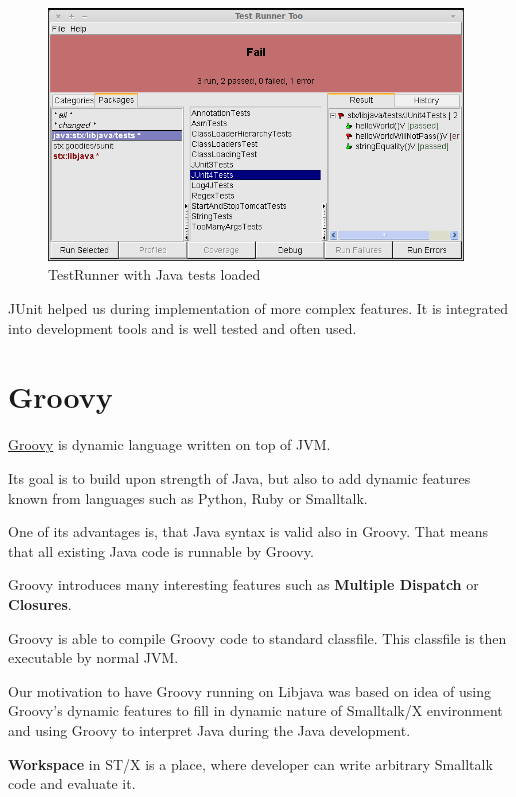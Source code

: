 \documentclass[11pt,twoside,a4paper]{book}
\newcommand{\libjava}{{Libjava}}
\begin{document}
\begin{figure}[ht]
	\begin{center}
		\includegraphics[width=11cm]{figures/test_runner.png}
	\end{center}
	\caption{TestRunner with Java tests loaded}
	\label{fig:test_runner}
\end{figure}

JUnit helped us during implementation of more complex features.
It is integrated into development tools and is well tested and often used.

\section{Groovy}

\href{http://groovy.codehaus.org/}{Groovy} is dynamic language written on top of JVM. 

Its goal is to build upon strength of Java, but also to add dynamic features known from languages such as Python, Ruby or Smalltalk. 

One of its advantages is, that Java syntax is valid also in Groovy. 
That means that all existing Java code is runnable by Groovy.

Groovy introduces many interesting features such as \textbf{Multiple Dispatch} or \textbf{Closures}. 

Groovy is able to compile Groovy code to standard classfile.
This classfile is then executable by normal JVM.

Our motivation to have Groovy running on \libjava{} was based on idea of using Groovy's dynamic features to fill in dynamic nature of Smalltalk/X environment and using Groovy to interpret Java during the Java development.

\textbf{Workspace} in ST/X is a place, where developer can write arbitrary Smalltalk code and evaluate it. 
\end{document}
